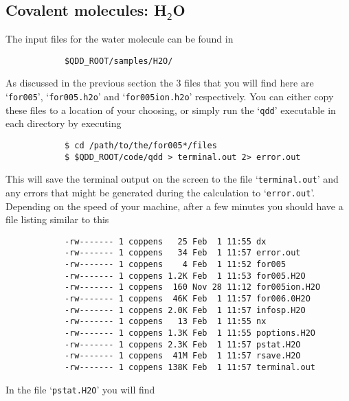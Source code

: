 \documentclass[11pt,a4paper]{article}
\begin{document}
		\subsection{Covalent molecules: H$_\mathsf{2}$O}
		The input files for the water molecule can be found in 
		\begin{verbatim}
			$QDD_ROOT/samples/H2O/
		\end{verbatim}
		As discussed in the previous section the 3 files that you will find here are `\texttt{for005}', `\texttt{for005.h2o}' and `\texttt{for005ion.h2o}' respectively. You can either copy these files to a location of your choosing, or simply run the `\texttt{qdd}' executable in each directory by executing
		\begin{verbatim}
			$ cd /path/to/the/for005*/files
			$ $QDD_ROOT/code/qdd > terminal.out 2> error.out
		\end{verbatim}
		This will save the terminal output on the screen to the file `\texttt{terminal.out}' and any errors that might be generated during the calculation to `\texttt{error.out}'. Depending on the speed of your machine, after a few minutes you should have a file listing similar to this
		\begin{verbatim}
			-rw------- 1 coppens   25 Feb  1 11:55 dx
			-rw------- 1 coppens   34 Feb  1 11:57 error.out
			-rw------- 1 coppens    4 Feb  1 11:52 for005
			-rw------- 1 coppens 1.2K Feb  1 11:53 for005.H2O
			-rw------- 1 coppens  160 Nov 28 11:12 for005ion.H2O
			-rw------- 1 coppens  46K Feb  1 11:57 for006.0H2O
			-rw------- 1 coppens 2.0K Feb  1 11:57 infosp.H2O
			-rw------- 1 coppens   13 Feb  1 11:55 nx
			-rw------- 1 coppens 1.3K Feb  1 11:55 poptions.H2O
			-rw------- 1 coppens 2.3K Feb  1 11:57 pstat.H2O
			-rw------- 1 coppens  41M Feb  1 11:57 rsave.H2O
			-rw------- 1 coppens 138K Feb  1 11:57 terminal.out
		\end{verbatim}
		In the file `\texttt{pstat.H2O}' you will find  
\end{document}
